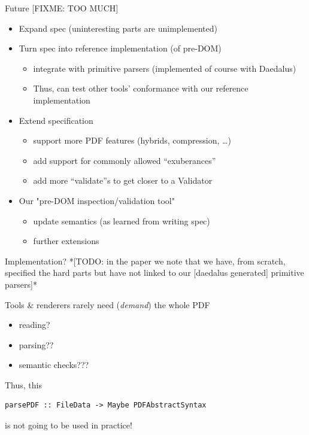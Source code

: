 \documentclass[t,10pt,xcolor={dvipsnames}]{beamer}
\begin{document}
\begin{frame}[label={sec:org900ec76}]{Future [FIXME: TOO MUCH]}
\begin{itemize}
\item Expand spec (uninteresting parts are unimplemented)
\item Turn spec into reference implementation (of pre-DOM)
\begin{itemize}
\item integrate with primitive parsers (implemented of course with Daedalus)
\item Thus, can test other tools’ conformance with our reference implementation
\end{itemize}
\item Extend specification
\begin{itemize}
\item support more PDF features (hybrids, compression, …)
\item add support for commonly allowed “exuberances”
\item add more “validate”s to get closer to a Validator
\end{itemize}
\item Our "pre-DOM inspection/validation tool"
\begin{itemize}
\item update semantics (as learned from writing spec)
\item further extensions
\end{itemize}
\end{itemize}
\end{frame}

\begin{frame}[label={sec:orgda070e2},fragile]{Implementation?}
 *[TODO: in the paper we note that we have, from scratch,
specified the hard parts but have not linked to our [daedalus generated]
primitive parsers]*

Tools \& renderers rarely need (\emph{demand}) the whole PDF
\begin{itemize}
\item reading?
\item parsing??
\item semantic checks???
\end{itemize}
\vspace{12pt}

Thus, this
\lstset{language=haskell,label= ,caption= ,captionpos=b,numbers=none}
\begin{lstlisting}
parsePDF :: FileData -> Maybe PDFAbstractSyntax
\end{lstlisting}
is not going to be used in practice!     
\end{frame}
\end{document}
